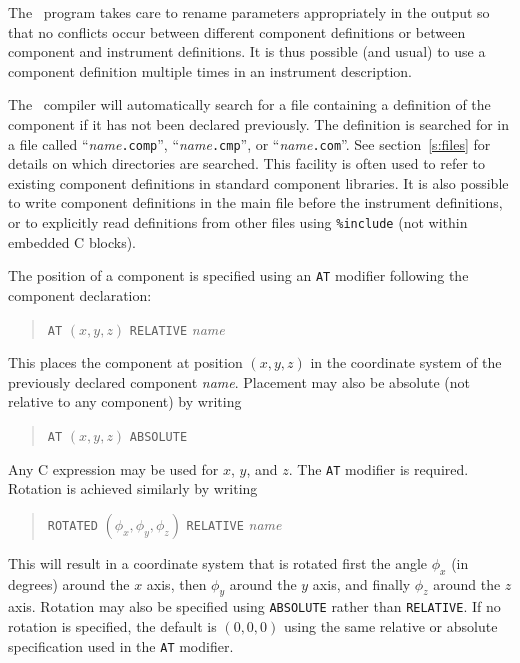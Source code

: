 {The \MCS\ program takes care to rename parameters appropriately in the
output so that no conflicts occur between different component
definitions or between component and instrument definitions. It is thus
possible (and usual) to use a component definition multiple times
in an instrument description.

The \MCS\ compiler will automatically search for a file containing a
definition of the component if it has not been declared previously. The
definition is searched for in a file called ``{\it name\/}{\tt .comp}'',
``{\it name\/}{\tt .cmp}'', or ``{\it name\/}{\tt .com}''. See
section~\ref{s:files} for details on which directories are searched. This
facility is often used to refer to existing component definitions in
standard component libraries. It is also possible to write component
definitions in the main file before the instrument definitions, or to
explicitly read definitions from other files using \verb+%include+ 
(not within embedded C blocks).

The position of a component is specified using an \texttt{AT} modifier
following the component declaration:
  
\begin{quote}
  \texttt{AT} $(x,y,z)$ \texttt{RELATIVE} \textit{name}
\end{quote}
This places the component at position $(x,y,z)$ in the coordinate system
of the previously declared component \textit{name}. Placement may also
be absolute (not relative to any component) by writing
\begin{quote}
  \texttt{AT} $(x,y,z)$ \texttt{ABSOLUTE}
\end{quote}
Any C expression may be used for $x$, $y$, and $z$. The \texttt{AT}
modifier is required.
Rotation is achieved similarly by writing 
\begin{quote}
  \texttt{ROTATED} $(\phi_x,\phi_y,\phi_z)$ \texttt{RELATIVE} \textit{name}
\end{quote}
This will result in a coordinate system that is rotated first the angle
$\phi_x$ (in degrees) around the $x$ axis, then $\phi_y$ around the $y$ axis, and finally
$\phi_z$ around the $z$ axis. Rotation may also be specified using
\texttt{ABSOLUTE} rather than \texttt{RELATIVE}. If no rotation is
specified, the default is $(0,0,0)$ using the same relative or absolute
specification used in the \texttt{AT} modifier.

}
